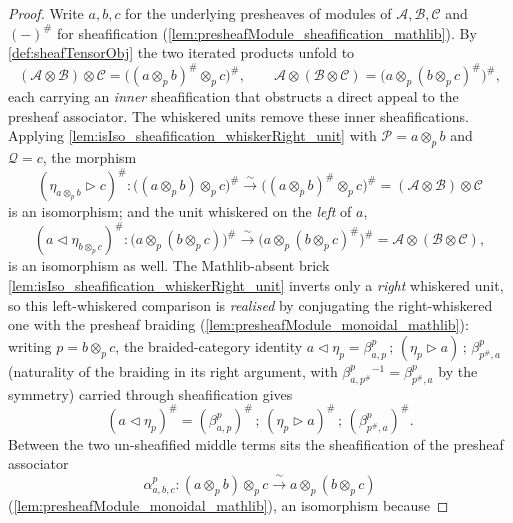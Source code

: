 \begin{proof}
  Write \(a, b, c\) for the underlying presheaves of modules of
  \(\mathcal{A}, \mathcal{B}, \mathcal{C}\) and \((-)^{\#}\) for sheafification
  (\cref{lem:presheafModule_sheafification_mathlib}). By
  \cref{def:sheafTensorObj} the two iterated products unfold to
  \[
    (\mathcal{A} \otimes \mathcal{B}) \otimes \mathcal{C}
      = \bigl((a \otimes_p b)^{\#} \otimes_p c\bigr)^{\#},
    \qquad
    \mathcal{A} \otimes (\mathcal{B} \otimes \mathcal{C})
      = \bigl(a \otimes_p (b \otimes_p c)^{\#}\bigr)^{\#},
  \]
  each carrying an \emph{inner} sheafification that obstructs a direct appeal to
  the presheaf associator. The whiskered units remove these inner
  sheafifications. Applying \cref{lem:isIso_sheafification_whiskerRight_unit}
  with \(\mathcal{P} = a \otimes_p b\) and \(\mathcal{Q} = c\), the morphism
  \[
    (\eta_{a \otimes_p b} \rhd c)^{\#} :
    \bigl((a \otimes_p b) \otimes_p c\bigr)^{\#}
    \xrightarrow{\ \sim\ }
    \bigl((a \otimes_p b)^{\#} \otimes_p c\bigr)^{\#}
    = (\mathcal{A} \otimes \mathcal{B}) \otimes \mathcal{C}
  \]
  is an isomorphism; and the unit whiskered on the \emph{left} of \(a\),
  \[
    (a \lhd \eta_{b \otimes_p c})^{\#} :
    \bigl(a \otimes_p (b \otimes_p c)\bigr)^{\#}
    \xrightarrow{\ \sim\ }
    \bigl(a \otimes_p (b \otimes_p c)^{\#}\bigr)^{\#}
    = \mathcal{A} \otimes (\mathcal{B} \otimes \mathcal{C}),
  \]
  is an isomorphism as well. The Mathlib-absent brick
  \cref{lem:isIso_sheafification_whiskerRight_unit} inverts only a \emph{right}
  whiskered unit, so this left-whiskered comparison is \emph{realised} by
  conjugating the right-whiskered one with the presheaf braiding
  (\cref{lem:presheafModule_monoidal_mathlib}): writing \(p = b \otimes_p c\), the
  braided-category identity \(a \lhd \eta_{p} = \beta^p_{a,p}\,;\,
  (\eta_{p} \rhd a)\,;\,\beta^p_{p^{\#},a}\) (naturality of the braiding in its
  right argument, with \(\beta^p_{a,p^{\#}}{}^{-1} = \beta^p_{p^{\#},a}\) by the
  symmetry) carried through sheafification gives
  \[
    (a \lhd \eta_{p})^{\#}
      = (\beta^p_{a,p})^{\#} \,;\, (\eta_{p} \rhd a)^{\#}
        \,;\, (\beta^p_{p^{\#},a})^{\#}.
  \]
  Between the two un-sheafified middle terms sits the sheafification of the
  presheaf associator
  \[
    \alpha^p_{a,b,c} :
    (a \otimes_p b) \otimes_p c
    \xrightarrow{\ \sim\ }
    a \otimes_p (b \otimes_p c)
  \]
  (\cref{lem:presheafModule_monoidal_mathlib}), an isomorphism because

\end{proof}
